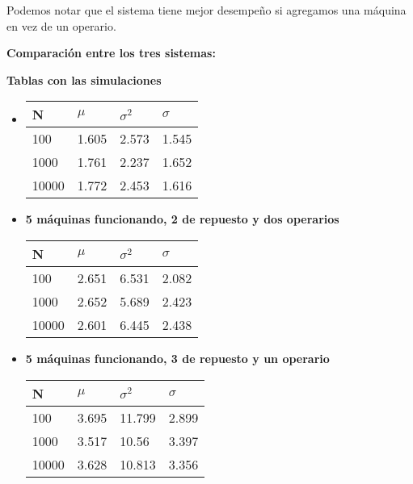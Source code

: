 \documentclass[12pt]{article}
\begin{document}
Podemos notar que el sistema tiene mejor desempeño si agregamos una máquina en
vez de un operario.

\vspace{0.1in}
{\bf Comparación entre los tres sistemas:}


\begin{figure}[hbt]
\noindent{}
\end{figure}

\pagebreak

{\bf Tablas con las simulaciones}

\vspace{0.2in}
\begin{itemize}


\item{}
\begin{center}
    \begin{tabular}{| l | l | l | l |}
    \hline
    N & $\mu$&$\sigma^2$&$\sigma$\\ \hline
    100 & 1.605& 2.573&1.545 \\ \hline
    1000 &1.761 &2.237 &1.652 \\ \hline
    10000 &1.772 &2.453 & 1.616 \\
    \hline
    \end{tabular}
\end{center}
\vspace{0.2in}
\item{\bf 5 máquinas funcionando, 2 de repuesto y dos operarios}
\begin{center}
    \begin{tabular}{| l | l | l | l |}
    \hline
    N & $\mu$&$\sigma^2$&$\sigma$\\ \hline
    100 & 2.651& 6.531&2.082 \\ \hline
    1000 &2.652 &5.689 &2.423 \\ \hline
    10000 &2.601 &6.445 & 2.438 \\
    \hline
    \end{tabular}
\end{center}
\vspace{0.2in}
\item{\bf 5 máquinas funcionando, 3 de repuesto y un operario}
\begin{center}
    \begin{tabular}{| l | l | l | l |}
    \hline
    N & $\mu$&$\sigma^2$&$\sigma$\\ \hline
    100 & 3.695& 11.799&2.899 \\ \hline
    1000 &3.517 &10.56 &3.397 \\ \hline
    10000 &3.628 &10.813 & 3.356 \\
    \hline
    \end{tabular}
\end{center}
\end{itemize}
\end{document}
